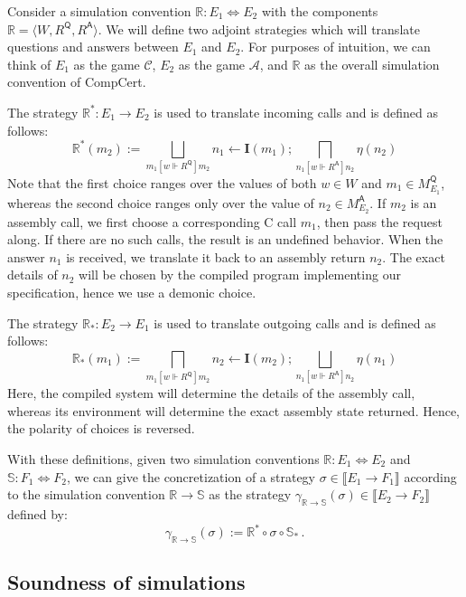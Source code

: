 \documentclass[format=sigplan,authordraft]{acmart}
\newcommand{\kw}[1]{\ensuremath{\mathsf{#1}}}
\newcommand{\ifr}[1]{\mathrel{[{#1}]}}
\begin{document}
Consider a simulation convention $\mathbb{R} : E_1 \Leftrightarrow E_2$
with the components $\mathbb{R} = \langle W, R^\kw{Q}, R^\kw{A} \rangle$.
We will define two adjoint strategies
which will translate questions and answers between
$E_1$ and $E_2$.
For purposes of intuition,
we can think of $E_1$ as the game $\mathcal{C}$,
$E_2$ as the game $\mathcal{A}$,
and $\mathbb{R}$ as the overall simulation convention of CompCert.

The strategy $\mathbb{R}^* : E_1 \rightarrow E_2$
is used to translate incoming calls
and is defined as follows:
\[
    \mathbb{R}^*(m_2) :=
       \bigsqcup_{m_1 \ifr{w \Vdash R^\kw{Q}} m_2}
       n_1 \leftarrow \mathbf{I}(m_1) ;
       \bigsqcap_{n_1 \ifr{w \Vdash R^\kw{A}} n_2}
       \eta(n_2)
\]
Note that the first choice ranges over the values of both
$w \in W$ and $m_1 \in M_{E_1}^\kw{Q}$,
whereas the second choice ranges only over the value of
$n_2 \in M_{E_2}^\kw{A}$.
If $m_2$ is an assembly call,
we first choose a corresponding C call $m_1$,
then pass the request along.
If there are no such calls,
the result is an undefined behavior.
When the answer $n_1$ is received,
we translate it back to an assembly return $n_2$.
The exact details of $n_2$ will be chosen by
the compiled program implementing our specification,
hence we use a demonic choice.

The strategy $\mathbb{R}_* : E_2 \rightarrow E_1$
is used to translate outgoing calls
and is defined as follows:
\[
    \mathbb{R}_*(m_1) :=
       \bigsqcap_{m_1 \ifr{w \Vdash R^\kw{Q}} m_2}
       n_2 \leftarrow \mathbf{I}(m_2) ;
       \bigsqcup_{n_1 \ifr{w \Vdash R^\kw{A}} n_2}
       \eta(n_1)
\]
Here,
the compiled system will determine
the details of the assembly call,
whereas its environment will determine
the exact assembly state returned.
Hence, the polarity of choices is reversed.

With these definitions,
given two simulation conventions
$\mathbb{R} : E_1 \Leftrightarrow E_2$ and
$\mathbb{S} : F_1 \Leftrightarrow F_2$,
we can give the concretization of a strategy
$\sigma \in \llbracket E_1 \rightarrow F_1 \rrbracket$
according to the simulation convention
$\mathbb{R} \rightarrow \mathbb{S}$
as the strategy
$\gamma_{\mathbb{R} \rightarrow \mathbb{S}}(\sigma) \in
  \llbracket E_2 \rightarrow F_2 \rrbracket$
defined by:
\[
    \gamma_{\mathbb{R} \rightarrow \mathbb{S}}(\sigma) :=
    \mathbb{R}^* \circ \sigma \circ \mathbb{S}_* \,.
\]


\subsection{Soundness of simulations} %
\end{document}

